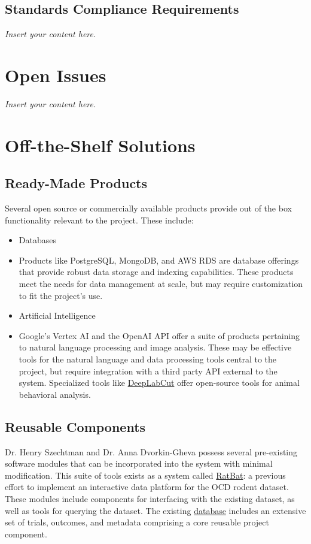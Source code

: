\documentclass[12pt]{article}
\newcommand{\lips}{\textit{Insert your content here.}}
\begin{document}
\subsection{Standards Compliance Requirements}
\lips

\section{Open Issues}
\lips

\section{Off-the-Shelf Solutions}
\subsection{Ready-Made Products}

Several open source or commercially available products provide out of the box functionality relevant to the project. These include: 

\begin{itemize}
    \item Databases 
    \item[] Products like PostgreSQL, MongoDB, and AWS RDS are database offerings that provide robust data storage and indexing capabilities. These products meet the needs for data management at scale, but may require customization to fit the project's use. 
    \item Artificial Intelligence 
    \item[] Google's Vertex AI and the OpenAI API offer a suite of products pertaining to natural language processing and image analysis. These may be effective tools for the natural language and data processing tools central to the project, but require integration with a third party API external to the system. Specialized tools like \href{https://github.com/DeepLabCut/DeepLabCut}{DeepLabCut} offer open-source tools for animal behavioral analysis. 

\end{itemize}



\subsection{Reusable Components}

Dr. Henry Szechtman and Dr. Anna Dvorkin-Gheva possess several pre-existing software modules that can be incorporated into the system with minimal modification. This suite of tools exists as a system called \href{https://github.com/brandonc-edu/RatBAT/tree/main}{RatBat}: a previous effort to implement an interactive data platform for the OCD rodent dataset. These modules include components for interfacing with the existing dataset, as well as tools for querying the dataset. The existing \href{https://doi.org/10.1093/gigascience/giac092}{database} includes an extensive set of trials, outcomes, and metadata comprising a core reusable project component.
\end{document}
